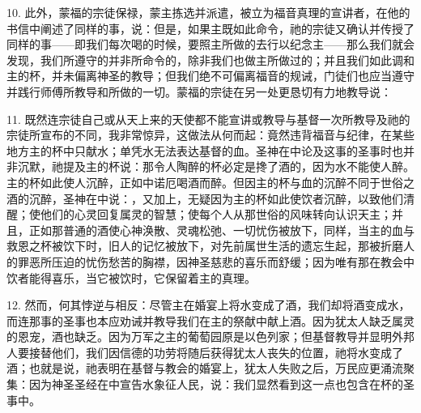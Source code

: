10. 此外，蒙福的宗徒保禄，蒙主拣选并派遣，被立为福音真理的宣讲者，在他的书信中阐述了同样的事，说：但是，如果主既如此命令，祂的宗徒又确认并传授了同样的事——即我们每次喝的时候，要照主所做的去行以纪念主——那么我们就会发现，我们所遵守的并非所命令的，除非我们也做主所做过的；并且我们如此调和主的杯，并未偏离神圣的教导；但我们绝不可偏离福音的规诫，门徒们也应当遵守并践行师傅所教导和所做的一切。蒙福的宗徒在另一处更恳切有力地教导说：\par

11. 既然连宗徒自己或从天上来的天使都不能宣讲或教导与基督一次所教导及祂的宗徒所宣布的不同，我非常惊异，这做法从何而起：竟然违背福音与纪律，在某些地方主的杯中只献水；单凭水无法表达基督的血。圣神在中论及这事的圣事时也并非沉默，祂提及主的杯说：那令人陶醉的杯必定是搀了酒的，因为水不能使人醉。主的杯如此使人沉醉，正如中诺厄喝酒而醉。但因主的杯与血的沉醉不同于世俗之酒的沉醉，圣神在中说：，又加上，无疑因为主的杯如此使饮者沉醉，以致他们清醒；使他们的心灵回复属灵的智慧；使每个人从那世俗的风味转向认识天主；并且，正如那普通的酒使心神涣散、灵魂松弛、一切忧伤被放下，同样，当主的血与救恩之杯被饮下时，旧人的记忆被放下，对先前属世生活的遗忘生起，那被折磨人的罪恶所压迫的忧伤愁苦的胸襟，因神圣慈悲的喜乐而舒缓；因为唯有那在教会中饮者能得喜乐，当它被饮时，它保留着主的真理。\par

12. 然而，何其悖逆与相反：尽管主在婚宴上将水变成了酒，我们却将酒变成水，而连那事的圣事也本应劝诫并教导我们在主的祭献中献上酒。因为犹太人缺乏属灵的恩宠，酒也缺乏。因为万军之主的葡萄园原是以色列家；但基督教导并显明外邦人要接替他们，我们因信德的功劳将随后获得犹太人丧失的位置，祂将水变成了酒；也就是说，祂表明在基督与教会的婚宴上，犹太人失败之后，万民应更涌流聚集：因为神圣圣经在中宣告水象征人民，说：我们显然看到这一点也包含在杯的圣事中。\par

